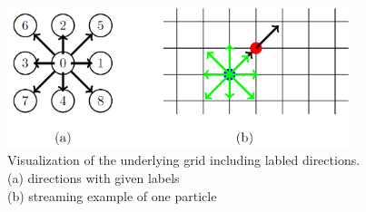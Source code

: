 \begin{figure}[h!]
    \begin{center}
        \includegraphics[width=10cm]{logos/Gitter_LBM.png}
        \caption[Visualization of the underlying grid including labled directions.]{
            Visualization of the underlying grid including labled directions. \\
            (a) directions with given labels \\
            (b) streaming example of one particle
        }
        \label{fig:bte-scheme}
    \end{center}
\end{figure}
